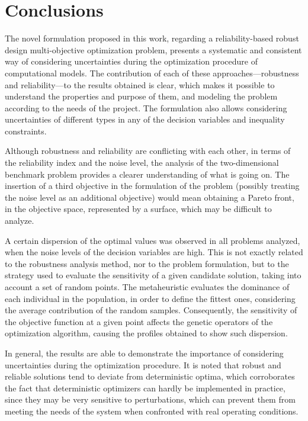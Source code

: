 \documentclass[final,5p,times,twocolumn,numbers]{elsarticle}
\begin{document}
\section{Conclusions} \label{sec:conclusions}

The novel formulation proposed in this work, regarding a reliability-based robust design multi-objective optimization problem, presents a systematic and consistent way of considering uncertainties during the optimization procedure of computational models. The contribution of each of these approaches---robustness and reliability---to the results obtained is clear, which makes it possible to understand the properties and purpose of them, and modeling the problem according to the needs of the project. The formulation also allows considering uncertainties of different types in any of the decision variables and inequality constraints.

Although robustness and reliability are conflicting with each other, in terms of the reliability index and the noise level, the analysis of the two-dimensional benchmark problem provides a clearer understanding of what is going on. The insertion of a third objective in the formulation of the problem (possibly treating the noise level as an additional objective) would mean obtaining a Pareto front, in the objective space, represented by a surface, which may be difficult to analyze.

A certain dispersion of the optimal values was observed in all problems analyzed, when the noise levels of the decision variables are high. This is not exactly related to the robustness analysis method, nor to the problem formulation, but to the strategy used to evaluate the sensitivity of a given candidate solution, taking into account a set of random points. The metaheuristic evaluates the dominance of each individual in the population, in order to define the fittest ones, considering the average contribution of the random samples. Consequently, the sensitivity of the objective function at a given point affects the genetic operators of the optimization algorithm, causing the profiles obtained to show such dispersion.

In general, the results are able to demonstrate the importance of considering uncertainties during the optimization procedure. It is noted that robust and reliable solutions tend to deviate from deterministic optima, which corroborates the fact that deterministic optimizers can hardly be implemented in practice, since they may be very sensitive to perturbations, which can prevent them from meeting the needs of the system when confronted with real operating conditions.
\end{document}
